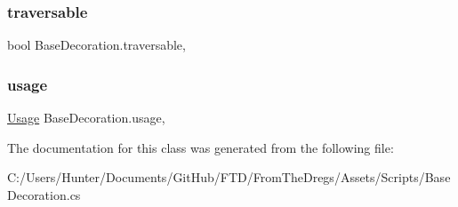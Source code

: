 \subsubsection{\texorpdfstring{traversable}{traversable}}
{\footnotesize\ttfamily bool Base\+Decoration.\+traversable\hspace{0.3cm}{\ttfamily [get]}, {\ttfamily [set]}}

\mbox{\label{class_base_decoration_a502a5352e9f53da746d96a75ff31c3f0}} 
\subsubsection{\texorpdfstring{usage}{usage}}
{\footnotesize\ttfamily \mbox{\hyperlink{class_base_decoration_ad8b9ff9e5d7dc488ca94fed2efa45a6e}{Usage}} Base\+Decoration.\+usage\hspace{0.3cm}{\ttfamily [get]}, {\ttfamily [set]}}



The documentation for this class was generated from the following file\+:\begin{DoxyCompactItemize}
\item 
C\+:/\+Users/\+Hunter/\+Documents/\+Git\+Hub/\+F\+T\+D/\+From\+The\+Dregs/\+Assets/\+Scripts/Base\+Decoration.\+cs\end{DoxyCompactItemize}

